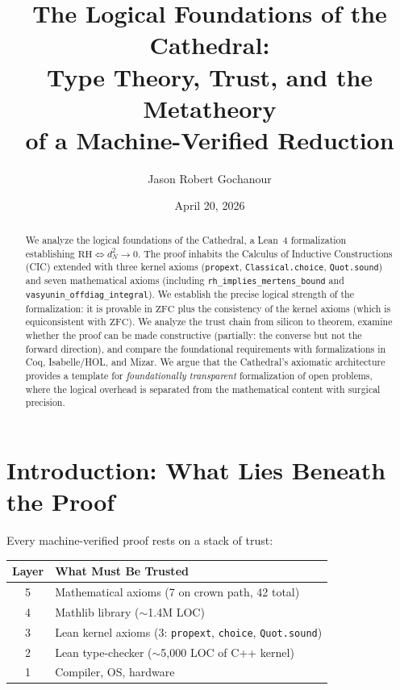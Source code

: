 \documentclass[11pt,a4paper]{article}
\title{%
  The Logical Foundations of the Cathedral:\\
  Type Theory, Trust, and the Metatheory\\
  of a Machine-Verified Reduction%
}
\author{
  Jason Robert Gochanour
}
\date{April 20, 2026}
\theoremstyle{plain}
\theoremstyle{definition}
\newcommand{\lean}[1]{\texttt{#1}}
\newcommand{\RH}{\ensuremath{\mathrm{RH}}}
\newcommand{\ZFC}{\mathrm{ZFC}}
\begin{document}
\maketitle

\begin{abstract}
We analyze the logical foundations of the Cathedral, a Lean~4
formalization establishing $\RH \iff d_N^2 \to 0$.
The proof inhabits the Calculus of Inductive Constructions (CIC)
extended with three kernel axioms (\lean{propext}, \lean{Classical.choice},
\lean{Quot.sound}) and seven mathematical axioms
(including \lean{rh\_implies\_mertens\_bound} and \lean{vasyunin\_offdiag\_integral}).
We establish the precise logical strength of the formalization:
it is provable in $\ZFC$ plus the consistency of the kernel axioms
(which is equiconsistent with $\ZFC$). We analyze the trust chain
from silicon to theorem, examine whether the proof can be made
constructive (partially: the converse but not the forward direction),
and compare the foundational requirements with formalizations in
Coq, Isabelle/HOL, and Mizar. We argue that the Cathedral's
axiomatic architecture provides a template for \emph{foundationally
transparent} formalization of open problems, where the logical
overhead is separated from the mathematical content with surgical
precision.
\end{abstract}

\tableofcontents

\section{Introduction: What Lies Beneath the Proof}

Every machine-verified proof rests on a stack of trust:

\begin{center}
\begin{tabular}{@{}cl@{}}
\toprule
\textbf{Layer} & \textbf{What Must Be Trusted} \\
\midrule
5 & Mathematical axioms (7 on crown path, 42 total) \\
4 & Mathlib library ($\sim$1.4M LOC) \\
3 & Lean kernel axioms (3: \lean{propext}, \lean{choice}, \lean{Quot.sound}) \\
2 & Lean type-checker ($\sim$5{,}000 LOC of C++ kernel) \\
1 & Compiler, OS, hardware \\
\bottomrule
\end{tabular}
\end{center}
\end{document}
